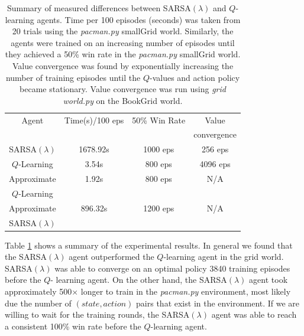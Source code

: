 \documentclass[10pt,conference]{IEEEtran}
\begin{document}
	\begin{table}
		\begin{tabular}{|c|c|c|c|}
			\hline
			Agent & Time(s)/100 eps & 50\% Win Rate & Value \\
			& & & convergence \\
			\hline \hline
			SARSA\((\lambda)\) & 1678.92s & 1000 eps & 256 eps \\
			\hline
			\(Q\)-Learning & 3.54s & 800 eps & 4096 eps \\
			\hline
			Approximate & 1.92s & 800 eps & N/A \\
			\(Q\)-Learning & & & \\
			\hline
			Approximate & 896.32s & 1200 eps & N/A \\
			SARSA\((\lambda)\) & & & \\
			\hline
		\end{tabular}
		\caption{Summary of measured differences between SARSA\((\lambda)\)
		and \(Q\)-learning agents.  Time per 100 episodes (seconds) was 
		taken from 20 trials using the \textit{pacman.py} smallGrid world.  
		Similarly, the agents were trained on an increasing number of episodes until 
		they achieved a 50\% win rate in the \textit{pacman.py} smallGrid 
		world.  Value convergence was found by exponentially increasing 
		the number of training episodes until the \(Q\)-values and 
		action policy became stationary.  Value convergence was run
		using \textit{grid world.py} on the BookGrid world.}
		\label{summary}
	\end{table}
			
	Table \ref{summary} shows a summary of the experimental results.  In 
	general we found that the SARSA\((\lambda)\) agent outperformed the 
	\(Q\)-learning agent in the grid world.  SARSA\((\lambda)\) was able to 
	converge on an optimal policy 3840 training episodes before the \(Q\)-
	learning agent.  On the other hand, the SARSA\((\lambda)\) agent took approximately
	500\(\times\) longer to train in the \textit{pacman.py} environment, most 
	likely due the number of \((state, action)\) pairs that exist in the 
	environment.  If we are willing to wait for the training rounds, the 
	SARSA\((\lambda)\) agent was able to reach a consistent 100\% win rate before
	the \(Q\)-learning agent. 
\end{document}
